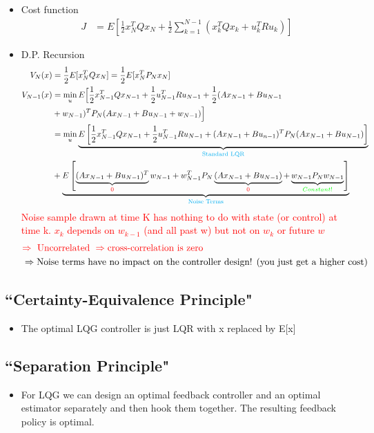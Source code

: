 \documentclass[11pt]{article}
\begin{document}
 \begin{itemize}
     \item Cost function
     \begin{align*}
         J &= E\left[\frac{1}{2}x_N^TQx_N + \frac{1}{2}\sum_{k=1}^{N-1} (x_k^TQx_k + u_k^TRu_k)\right]
     \end{align*}
     \item D.P. Recursion
     \begin{align*}
         V_N(x) &= \frac{1}{2}E[x_N^TQx_N] = \frac{1}{2}E[x_N^TP_Nx_N]
         \\
         V_{N-1}(x) &= \min_u E\Big[\frac{1}{2}x_{N-1}^TQx_{N-1} + \frac{1}{2}u_{N-1}^TRu_{N-1} + \frac{1}{2}(Ax_{N-1} + Bu_{N-1} \\ & + w_{N-1})^TP_N(Ax_{N-1} + Bu_{N-1} + w_{N-1})\Big] 
         \\
         &= \min_u \underbrace{E\left[\frac{1}{2}x_{N-1}^TQx_{N-1} + \frac{1}{2} u_{N-1}^TRu_{N-1} + (Ax_{N-1} + Bu_{n-1})^TP_N(Ax_{N-1} + Bu_{N-1})\right]}_{\textcolor{cyan}{\text{Standard LQR}}} 
         \\
         & + \underbrace{E\left[ \underbrace{(Ax_{N-1} + Bu_{N-1})^T}_{\textcolor{red}{0}}w_{N-1}+ w_{N-1}^TP_N\underbrace{(Ax_{N-1} + Bu_{N-1})}_{\textcolor{red}{0}} +\underbrace{w_{N-1}P_Nw_{N-1}}_{\textcolor{green}{Constant!}} \right]}_{\textcolor{cyan}{\text{Noise Terms}}}
     \end{align*}
     \textcolor{red}{Noise sample drawn at time K has nothing to do with state (or control) at time k. $x_k$ depends on $w_{k-1}$ (and all past w) but not on $w_k$ or future $w$}
     \begin{align*}
         &\textcolor{red}{\Rightarrow \text{ Uncorrelated } \Rightarrow \text{cross-correlation is zero}}
         \\
        & \Rightarrow \text{Noise terms have no impact on the controller design! (you just get a higher cost)}
     \end{align*}
 \end{itemize}

 \subsection*{``Certainty-Equivalence Principle"}
 \begin{itemize}
     \item The optimal LQG controller is just LQR with x replaced by E[x]
 \end{itemize}

 \subsection*{``Separation Principle"} 
 \begin{itemize}
     \item For LQG we can design an optimal feedback controller and an optimal estimator separately and then hook them together. The resulting feedback policy is optimal.
 \end{itemize}
\end{document}
